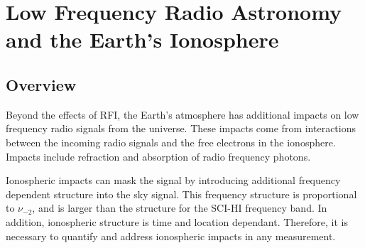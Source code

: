 \chapter{Low Frequency Radio Astronomy and the Earth's Ionosphere}\label{Ch:Iono}

\section{Overview}
Beyond the effects of RFI, the Earth's atmosphere has additional impacts on low frequency radio signals from the universe. These impacts come from interactions between the incoming radio signals and the free electrons in the ionosphere. Impacts include refraction and absorption of radio frequency photons. 

Ionospheric impacts can mask the \cm signal by introducing additional frequency dependent structure into the sky signal. This frequency structure is proportional to $\nu_{-2}$, and is larger than the \cm structure for the SCI-HI frequency band. In addition, ionospheric structure is time and location dependant. Therefore, it is necessary to quantify and address ionospheric impacts in any \cm measurement. 



